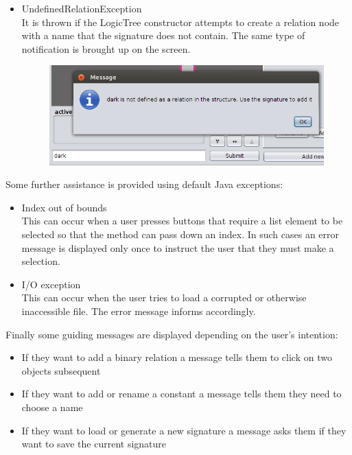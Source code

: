 \documentclass{report}
\begin{document}
\begin{itemize}
\item UndefinedRelationException\\
It is thrown if the LogicTree constructor attempts to create a relation node 
with a name that the signature does not contain. The same type of notification
is brought up on the screen.
\begin{figure}[h!]
\centering \includegraphics[scale=0.6]{undefrel.png}
\end{figure}

\end{itemize}

\noindent Some further assistance is provided using default Java exceptions:
\begin{itemize}
\item Index out of bounds\\
This can occur when a user presses buttons that require a list element to be 
selected so that the method can pass down an index. In such cases an error 
message is displayed only once to instruct the user that they must make a 
selection.
\item I/O exception\\
This can occur when the user tries to load a corrupted or otherwise inaccessible 
file. The error message informs accordingly.
\end{itemize}

\noindent Finally some guiding messages are displayed depending on the user's 
intention:

\begin{itemize}
\item If they want to add a binary relation a message tells them to click on two 
objects subsequent
\item If they want to add or rename a constant a message tells them they need to 
choose a name
\item If they want to load or generate a new signature a message asks them if 
they want to save the current signature
\end{itemize}
\end{document}
